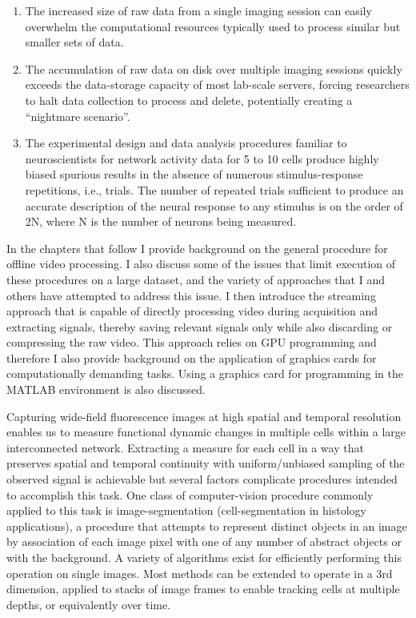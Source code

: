 \begin{enumerate}
	\def\labelenumi{\arabic{enumi}.}
	\itemsep1pt\parskip0pt
	\item
	      The increased size of raw data from a single imaging session can
	      easily overwhelm the computational resources typically used to process
	      similar but smaller sets of data.
	\item
	      The accumulation of raw data on disk over multiple imaging sessions
	      quickly exceeds the data-storage capacity of most lab-scale servers,
	      forcing researchers to halt data collection to process and delete,
	      potentially creating a ``nightmare scenario''.
	\item
	      The experimental design and data analysis procedures familiar to
	      neuroscientists for network activity data for 5 to 10 cells produce
	      highly biased spurious results in the absence of numerous
	      stimulus-response repetitions, i.e., trials.
	      The number of repeated trials sufficient to produce an accurate description of the neural response to any stimulus is on the order of 2N, where N is the number of neurons being measured.
\end{enumerate}

In the chapters that follow I provide background on the general procedure for offline video processing.
I also discuss some of the issues that limit execution of these procedures on a large dataset, and the variety of approaches that I and others have attempted to address this issue.
I then introduce the streaming approach that is capable of directly processing video during acquisition and extracting signals, thereby saving relevant signals only while also discarding or compressing the raw video.
This approach relies on GPU programming and therefore I also provide background on the application of graphics cards for computationally demanding tasks.
Using a graphics card for programming in the MATLAB environment is also discussed.

Capturing wide-field fluorescence images at high spatial and temporal resolution enables us to measure functional dynamic changes in multiple cells within a large interconnected network.
Extracting a measure for each cell in a way that preserves spatial and temporal continuity with uniform/unbiased sampling of the observed signal is achievable but several factors complicate procedures intended to accomplish this task.
One class of computer-vision procedure commonly applied to this task is image-segmentation (cell-segmentation in histology applications), a procedure that attempts to represent distinct objects in an image by association of each image pixel with one of any number of abstract objects or with the background.
A variety of algorithms exist for efficiently performing this operation on single images.
Most methods can be extended to operate in a 3rd dimension, applied to stacks of image frames to enable tracking cells at multiple depths, or equivalently over time.

